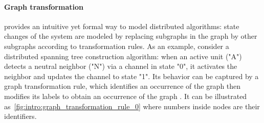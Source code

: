 \paragraph{Graph transformation} provides an intuitive yet formal way to model distributed algorithms: state changes of the system are modeled by replacing subgraphs in the graph by other subgraphs according to transformation rules.
As an example, consider a distributed spanning tree construction algorithm: when an active unit ("A") detects a neutral neighbor ("N") via a channel in state "0", it activates the neighbor and updates the channel to state "1". Its behavior can be captured by a graph transformation rule, which identifies an occurrence of the graph  then modifies its labels to obtain an occurrence of the graph . It can be illustrated as~\autoref{fig:intro:graph_transformation_rule_0} where numbers inside nodes are their identifiers.
 \begin{figure}[hbtp]
    \centering
    \caption{}
    \label{fig:intro:graph_transformation_rule_0}
\end{figure}
